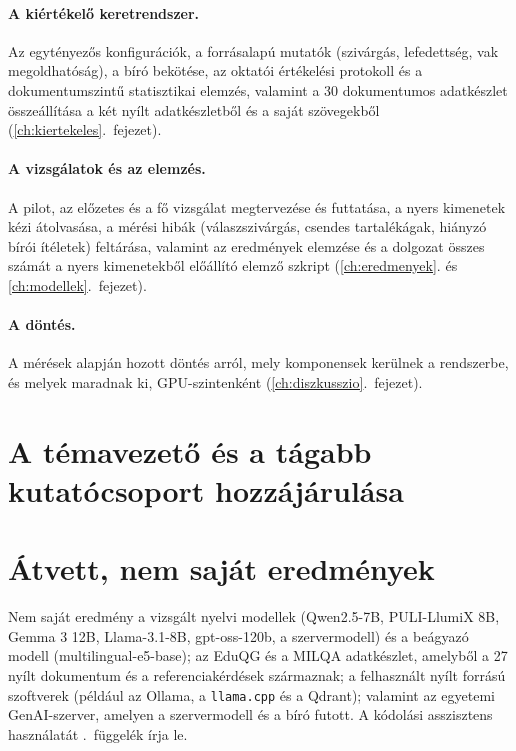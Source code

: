 \paragraph{A kiértékelő keretrendszer.} Az egytényezős konfigurációk, a forrásalapú mutatók (szivárgás,
lefedettség, vak megoldhatóság), a bíró bekötése, az oktatói értékelési protokoll és a dokumentumszintű
statisztikai elemzés, valamint a 30 dokumentumos adatkészlet összeállítása a két nyílt adatkészletből és a saját
szövegekből (\ref{ch:kiertekeles}.~fejezet). 

\paragraph{A vizsgálatok és az elemzés.} A pilot, az előzetes és a fő vizsgálat megtervezése és futtatása, a
nyers kimenetek kézi átolvasása, a mérési hibák (válaszszivárgás, csendes tartalékágak, hiányzó bírói
ítéletek) feltárása, valamint az eredmények elemzése és a dolgozat összes számát a nyers kimenetekből
előállító elemző szkript (\ref{ch:eredmenyek}. és \ref{ch:modellek}.~fejezet). 

\paragraph{A döntés.} A mérések alapján hozott döntés arról, mely komponensek kerülnek a rendszerbe, és melyek
maradnak ki, GPU-szintenként (\ref{ch:diszkusszio}.~fejezet).

\section{A témavezető és a tágabb kutatócsoport hozzájárulása}

  

\section{Átvett, nem saját eredmények}

Nem saját eredmény a vizsgált nyelvi modellek (Qwen2.5-7B, PULI-LlumiX 8B, Gemma 3 12B, Llama-3.1-8B,
gpt-oss-120b, a szervermodell) és a beágyazó modell (multilingual-e5-base); az EduQG és a MILQA adatkészlet,
amelyből a 27 nyílt dokumentum és a referenciakérdések származnak; a felhasznált nyílt forrású szoftverek
(például az Ollama, a \texttt{llama.cpp} és a Qdrant); valamint az egyetemi GenAI-szerver, amelyen a
szervermodell és a bíró futott. A kódolási asszisztens használatát \az{\ref{app-mi-nyilatkozat}}.~függelék írja
le.

